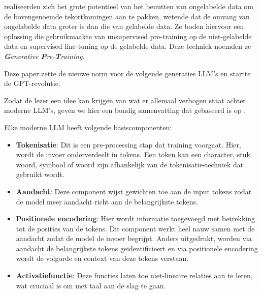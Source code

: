 \textcite{Radford2018} realiseerden zich het grote potentieel van het benutten van ongelabelde data om de bovengenoemde tekortkomingen aan te pakken, wetende dat de omvang van ongelabelde data groter is dan die van gelabelde data. Ze boden hiervoor een oplossing die gebruikmaakte van unsupervised pre-training op de niet-gelabelde data en supervised fine-tuning op de gelabelde data. Deze techniek noemden ze \textit{\textbf{G}enerative \textbf{P}re-\textbf{T}raining}.

Deze paper zette de nieuwe norm voor de volgende generaties \acrshort{LLM}'s en startte de GPT-revolutie.
 
Zodat de lezer een idee kan krijgen van wat er allemaal verbogen staat achter moderne \acrshort{LLM}'s, geven we hier een bondig samenvatting dat gebaseerd is op \textcite{Naveed2023}.

Elke moderne \acrshort{LLM} heeft volgende basiscomponenten: 
\begin{itemize} 
    \item \textbf{Tokenisatie}: Dit is een pre-processing stap dat training voorgaat. Hier, wordt de invoer onderverdeelt in tokens. Een token kan een character, stuk woord, symbool of woord zijn afhankelijk van de tokenisatie-techniek dat gebruikt wordt.
    \item \textbf{Aandacht}: Deze component wijst gewichten toe aan de input tokens zodat de model meer aandacht richt aan de belangrijkste tokens.
    \item \textbf{Positionele encodering}: Hier wordt informatie toegevoegd met betrekking tot de posities van de tokens. Dit component werkt heel nauw samen met de aandacht zodat de model de invoer begrijpt. Anders uitgedrukt, worden via aandacht de belangrijkste tokens geïdentificieert en via positionele encodering wordt de volgorde en context van deze tokens verstaan.
    \item \textbf{Activatiefunctie}: Deze functies laten toe niet-lineaire relaties aan te leren, wat cruciaal is om met taal aan de slag te gaan.
\end{itemize}

